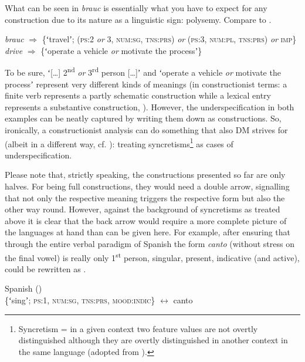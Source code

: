 \documentclass[output=paper]{langsci/langscibook}
\begin{document}
What can be seen in \textit{brauc} is essentially what you have to expect for any construction due to its nature as a linguistic sign: polysemy. Compare  to .

\begin{exe}
   \ex \label{ex:reiner:7} \textit{brauc} ${\Rightarrow}$ \{ʻtravelʼ; (\textsc{ps}:2 \textit{or} 3, \textsc{num}:\textsc{sg}, \textsc{tns}:\textsc{prs)} \textit{or} (\textsc{ps}:3, \textsc{num}:\textsc{pl}, \textsc{tns}:\textsc{prs)} \textit{or} \textsc{imp}\}
    \ex \label{ex:reiner:8} \textit{drive} ${\Rightarrow}$ \{ʻoperate a vehicle \textit{or} motivate the processʼ\}\\ \citep[38]{RumshiskyBatiukova2008}
\end{exe}

To be sure, ʻ[…] 2\textsuperscript{nd} \textit{or} 3\textsuperscript{rd} person […]ʼ and ʻoperate a vehicle \textit{or} motivate the processʼ represent very different kinds of meanings (in constructionist terms: a finite verb represents a partly schematic construction while a lexical entry represents a substantive construction, \citealt[2]{HoffmannHoffmann2013}). However, the underspecification in both examples can be neatly captured by writing them down as constructions. So, ironically, a constructionist analysis can do something that also DM strives for (albeit in a different way, cf. ): treating syncretisms\footnote{Syncretism = in a given context two feature values are not overtly distinguished although they are overtly distinguished in another context in the same language (adopted from \citealt[96]{Kramer2016}).\label{fn:reiner:7}} as cases of underspecification.

Please note that, strictly speaking, the constructions presented so far are only halves. For being full constructions, they would need a double arrow, signalling that not only the respective meaning triggers the respective form but also the other way round. However, against the background of syncretisms as treated above it is clear that the back arrow would require a more complete picture of the languages at hand than can be given here. For example, after ensuring that through the entire verbal paradigm of Spanish the form \textit{canto} (without stress on the final vowel) is really only 1\textsuperscript{st} person, singular, present, indicative (and active),  could be rewritten as .

\ea \label{ex:reiner:9} 
{Spanish (\citealt[170--712]{ButtEtAl2019})}\\
\textup{\{ʻsingʼ;} \textsc{ps}\textup{:1,} \textsc{num}\textup{:}\textsc{sg}, \textsc{tns}\textup{:}\textsc{prs}, \textsc{mood}\textup{:}\textsc{indic}\textup{\} $\leftrightarrow $} canto
\z 
\end{document}
